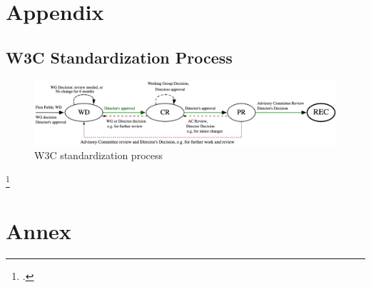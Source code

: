 \appendix

\chapter{Appendix}

\section{W3C Standardization Process}
\label{sec:w3c-process}

\begin{figure}[hbt]
	\centering
	\includegraphics[width=\textwidth,angle=90]{pics/svg/w3c_process.eps}
	\caption[W3C standardization process]{W3C standardization process\footnotemark}
	\label{fig:w3c}
\end{figure}
\footcitetext[Source:][Chapter 6.7]{w3c-process}

\chapter{Annex}

